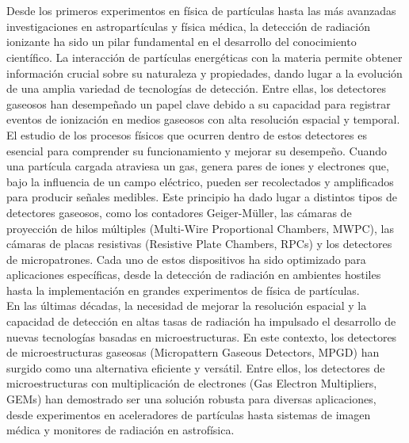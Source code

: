 \documentclass{report}
\begin{document}
\chapter{}

\vspace{1cm}

\noindent Desde los primeros experimentos en física de partículas hasta las más avanzadas investigaciones en astropartículas y física médica, la detección de radiación ionizante ha sido un pilar fundamental en el desarrollo del conocimiento científico. La interacción de partículas energéticas con la materia permite obtener información crucial sobre su naturaleza y propiedades, dando lugar a la evolución de una amplia variedad de tecnologías de detección. Entre ellas, los detectores gaseosos han desempeñado un papel clave debido a su capacidad para registrar eventos de ionización en medios gaseosos con alta resolución espacial y temporal.\\

\noindent El estudio de los procesos físicos que ocurren dentro de estos detectores es esencial para comprender su funcionamiento y mejorar su desempeño. Cuando una partícula cargada atraviesa un gas, genera pares de iones y electrones que, bajo la influencia de un campo eléctrico, pueden ser recolectados y amplificados para producir señales medibles. Este principio ha dado lugar a distintos tipos de detectores gaseosos, como los contadores Geiger-Müller, las cámaras de proyección de hilos múltiples (Multi-Wire Proportional Chambers, MWPC), las cámaras de placas resistivas (Resistive Plate Chambers, RPCs) y los detectores de micropatrones. Cada uno de estos dispositivos ha sido optimizado para aplicaciones específicas, desde la detección de radiación en ambientes hostiles hasta la implementación en grandes experimentos de física de partículas.\\

\noindent En las últimas décadas, la necesidad de mejorar la resolución espacial y la capacidad de detección en altas tasas de radiación ha impulsado el desarrollo de nuevas tecnologías basadas en microestructuras. En este contexto, los detectores de microestructuras gaseosas (Micropattern Gaseous Detectors, MPGD) han surgido como una alternativa eficiente y versátil. Entre ellos, los detectores de microestructuras con multiplicación de electrones (Gas Electron Multipliers, GEMs) han demostrado ser una solución robusta para diversas aplicaciones, desde experimentos en aceleradores de partículas hasta sistemas de imagen médica y monitores de radiación en astrofísica.\\
\end{document}
